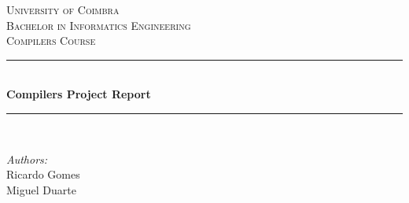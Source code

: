 \documentclass[12pt]{article}
\begin{document}
\begin{titlepage}

\newcommand{\HRule}{\rule{\linewidth}{0.5mm}} %

\center
 

\textsc{\LARGE University of Coimbra}\\[1.5cm] %
\textsc{\Large Bachelor in Informatics Engineering}\\[0.5cm] %
\textsc{\large Compilers Course}\\[0.5cm] %


\HRule \\[0.4cm]
{ \huge \bfseries Compilers Project Report}\\[0.4cm] %
\HRule \\[1.5cm]
 

\begin{minipage}{0.4\textwidth}
\begin{flushleft} \large
\emph{Authors:}\\
Ricardo Gomes \\
Miguel Duarte
\end{flushleft}
\end{minipage}
~
\begin{minipage}{0.4\textwidth}
\begin{flushright} \large
\end{flushright}
\end{minipage}\\[2cm]



\end{titlepage}
\end{document}
